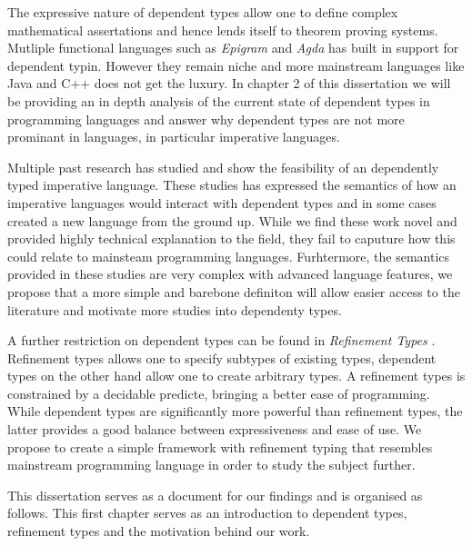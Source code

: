 \documentclass[a4paper,12pt]{report}
\begin{document}
\par
The expressive nature of dependent types allow one to 
define complex mathematical assertations and hence lends itself to 
theorem proving systems. Mutliple functional languages such as \textit{Epigram} 
\cite{epigram} and \textit{Agda} \cite{agda} has 
built in support for dependent typin.  However they remain niche and more 
mainstream languages like Java and C++ does not get the luxury. In chapter 2 of 
this dissertation we will be providing an in depth analysis of the current state 
of dependent types in programming languages and answer why dependent types are 
not more prominant in languages, in particular imperative languages.

\par
Multiple past research has studied and show the feasibility of an dependently typed 
imperative language. These studies has expressed the semantics of 
how an imperative languages would interact with dependent types and in some 
cases created a new language from the ground up. While we find these work novel 
and provided highly technical explanation to the field, they fail to caputure 
how this could relate to mainsteam programming languages. Furhtermore, the 
semantics provided in these studies are very complex with advanced language 
features, we propose that a more simple and barebone definiton will allow easier 
access to the literature and motivate more studies into dependenty types. 

\par
A further restriction on dependent types can be found in \textit{Refinement 
Types} \cite{refinementTypes}. Refinement types allows one to specify subtypes 
of existing types, dependent types on the other hand allow one to create 
arbitrary types. A refinement types is constrained by a decidable predicte, 
bringing a better ease of programming. While dependent types are significantly 
more powerful than refinement types, the latter provides a good balance between 
expressiveness and ease of use. We propose to create a simple framework with 
refinement typing that resembles mainstream programming language in order to 
study the subject further. 

\par
This dissertation serves as a document for our findings and is organised as 
follows. This first chapter serves as an introduction to dependent types, 
refinement types and the motivation behind our work.
\end{document}
